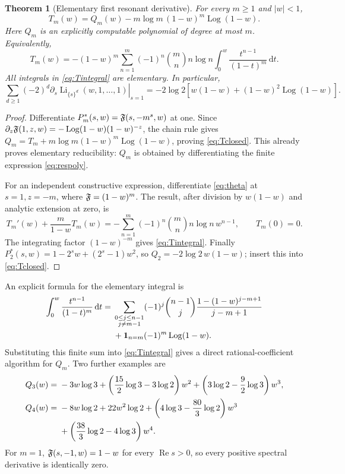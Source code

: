 \documentclass[11pt]{article}
\numberwithin{equation}{section}
\newtheorem{theorem}{Theorem}[section]
\theoremstyle{definition}\newtheorem{definition}[theorem]{Definition}
\theoremstyle{remark}\newtheorem{remark}[theorem]{Remark}
\DeclareMathOperator{\Li}{Li}
\DeclareMathOperator{\Log}{Log}
\DeclareMathOperator{\Rea}{Re}
\newcommand{\dd}{\,\mathrm d}
\begin{document}
\begin{theorem}[Elementary first resonant derivative]
\label{thm:firstres}
For every $m\ge1$ and $|w|<1$,
\begin{equation}
 \boxed{T_m(w)=Q_m(w)-m\log m\,(1-w)^m\Log(1-w)}.
 \label{eq:Tclosed}
\end{equation}
Here $Q_m$ is an explicitly computable polynomial of degree at most $m$.
Equivalently,
\begin{equation}
 T_m(w)=-(1-w)^m\sum_{n=1}^m(-1)^n\binom mn n\log n
            \int_0^w\frac{t^{n-1}}{(1-t)^m}\dd t.
 \label{eq:Tintegral}
\end{equation}
All integrals in \eqref{eq:Tintegral} are elementary. In particular,
\begin{equation}
 \boxed{\sum_{d\ge1}(-2)^d
   \left.\partial_s\Li_{\{s\}^d}(w,1,\ldots,1)\right|_{s=1}
 =-2\log2\left[w(1-w)+(1-w)^2\Log(1-w)\right]}.
 \label{eq:T2}
\end{equation}
\end{theorem}
\begin{proof}
Differentiate $P_m^*(s,w)=\mathfrak F(s,-m^s,w)$ at one. Since
$\partial_z\F(1,z,w)=-\Log(1-w)(1-w)^{-z}$, the chain rule gives
$Q_m=T_m+m\log m(1-w)^m\Log(1-w)$, proving \eqref{eq:Tclosed}.
This already proves elementary reducibility: $Q_m$ is obtained by
differentiating the finite expression \eqref{eq:respoly}.

For an independent constructive expression, differentiate
\eqref{eq:theta} at $s=1,z=-m$, where $\mathfrak F=(1-w)^m$.
The result, after division by $w(1-w)$ and analytic extension at zero, is
\begin{equation}
 T_m'(w)+\frac m{1-w}T_m(w)
   =-\sum_{n=1}^m(-1)^n\binom mn n\log n\,w^{n-1},
 \qquad T_m(0)=0.
 \label{eq:Tode}
\end{equation}
The integrating factor $(1-w)^{-m}$ gives \eqref{eq:Tintegral}.
Finally
$P_2^*(s,w)=1-2^s w+(2^s-1)w^2$, so
$Q_2=-2\log2\,w(1-w)$; insert this into \eqref{eq:Tclosed}.
\end{proof}

An explicit formula for the elementary integral is
\begin{align}
 \int_0^w\frac{t^{n-1}}{(1-t)^m}\dd t
 ={}&\sum_{\substack{0\le j\le n-1\\j\ne m-1}}
 (-1)^j\binom{n-1}{j}
 \frac{1-(1-w)^{j-m+1}}{j-m+1}\notag\\
 &+\mathbf1_{n=m}(-1)^m\Log(1-w).
 \label{eq:Iexplicit}
\end{align}
Substituting this finite sum into \eqref{eq:Tintegral} gives a direct
rational-coefficient algorithm for $Q_m$. Two further examples are
\begin{align}
 Q_3(w)={}&-3w\log3+
   \left(\frac{15}{2}\log3-3\log2\right)w^2
   +\left(3\log2-\frac92\log3\right)w^3,\label{eq:Q3}\\
 Q_4(w)={}&-8w\log2+22w^2\log2
  +\left(4\log3-\frac{80}{3}\log2\right)w^3\notag\\
 &+\left(\frac{38}{3}\log2-4\log3\right)w^4.
 \label{eq:Q4}
\end{align}
For $m=1$, $\mathfrak F(s,-1,w)=1-w$ for every $\Rea s>0$, so every positive
spectral derivative is identically zero.
\end{document}
